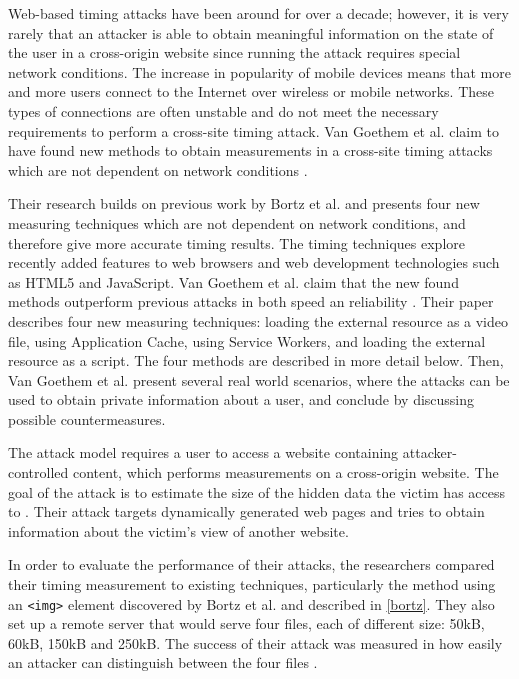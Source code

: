 \documentclass[10pt,a4paper,twoside]{book}
\begin{document}
Web-based timing attacks have been around for over a decade; however, it is very rarely that an attacker is able to obtain meaningful information on the state of the user in a cross-origin website since running the attack requires special network conditions. The increase in popularity of mobile devices means that more and more users connect to the Internet over wireless or mobile networks. These types of connections are often unstable and do not meet the necessary requirements to perform a cross-site timing attack. Van Goethem et al. claim to have found new methods to obtain measurements in a cross-site timing attacks which are not dependent on network conditions \cite{van2015clock}.

Their research builds on previous work by Bortz et al.\cite{bortz2007exposing} and presents four new measuring techniques which are not dependent on network conditions, and therefore give more accurate timing results. The timing techniques explore recently added features to web browsers and web development technologies such as HTML5 and JavaScript. Van Goethem et al. claim that the new found methods outperform previous attacks in both speed an reliability \cite{van2015clock}. Their paper describes four new measuring techniques: loading the external resource as a video file, using Application Cache, using Service Workers, and loading the external resource as a script. The four methods are described in more detail below. Then, Van Goethem et al. \cite{van2015clock} present several real world scenarios, where the attacks can be used to obtain private information about a user, and conclude by discussing possible countermeasures.

The attack model requires a user to access a website containing attacker- controlled content, which performs measurements on a cross-origin website. The goal of the attack is to estimate the size of the hidden data the victim has access to \cite{van2015clock}. Their attack targets dynamically generated web pages and tries to obtain information about the victim's view of another website. 

In order to evaluate the performance of their attacks, the researchers compared their timing measurement to existing techniques, particularly the method using an \texttt{<img>} element discovered by Bortz et al. and described in \ref{bortz}. They also set up a remote server that would serve four files, each of different size: 50kB, 60kB, 150kB and 250kB. The success of their attack was measured in how easily an attacker can distinguish between the four files \cite{van2015clock}.
\end{document}
